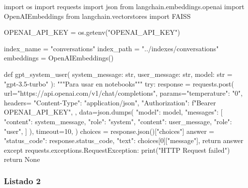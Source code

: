 \begin{APACode}
import os
import requests
import json
from langchain.embeddings.openai import OpenAIEmbeddings
from langchain.vectorstores import FAISS

OPENAI_API_KEY = os.getenv("OPENAI_API_KEY")

index_name = "conversations"
index_path = "../indexes/conversations"
embeddings = OpenAIEmbeddings()

def gpt_system_user(
    system_message: str, user_message: str, model: str = "gpt-3.5-turbo"
):
    """Para usar en notebooks"""
    try:
        response = requests.post(
            url="https://api.openai.com/v1/chat/completions",
            params={"temperature": "0"},
            headers={
                "Content-Type": "application/json",
                "Authorization": f"Bearer {OPENAI_API_KEY}",
            },
            data=json.dumps({
                "model": model,
                "messages": [
                    {"content": system_message, "role": "system"},
                    {"content": user_message, "role": "user"},
                ]
            }),
            timeout=10,
        )
        choices = response.json()["choices"]
        answer = {
            "status_code": response.status_code,
            "text": choices[0]["message"],
        }
        return answer
    except requests.exceptions.RequestException:
        print("HTTP Request failed")
        return None
\end{APACode}

\subsubsection{Listado 2}
\label{anexo:code-4-1-13-2}


